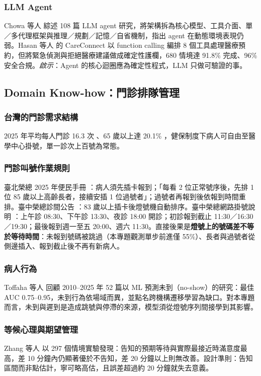 \documentclass[11pt,twocolumn]{article}
\begin{document}
\subsubsection{LLM Agent}
Chowa 等人 \cite{chowa2026} 綜述 108 篇 LLM agent 研究，將架構拆為核心模型、工具介面、單／多代理框架與推理／規劃／記憶／自省機制，指出 agent 在動態環境表現仍弱。Hasan 等人 \cite{hasan2026} 的 CareConnect 以 function calling 編排 8 個工具處理醫療預約，但將緊急偵測與拒絕醫療建議做成確定性護欄，680 情境達 91.8\% 完成、96\% 安全合規。\textit{啟示}：Agent 的核心迴圈應為確定性程式，LLM 只做可驗證的事。

\subsection{Domain Know-how：門診排隊管理}

\subsubsection{台灣的門診需求結構}
2025 年平均每人門診 16.3 次 \cite{nhia2025}、65 歲以上達 20.1\% \cite{moi2025}，健保制度下病人可自由至醫學中心掛號，單一診次上百號為常態。

\subsubsection{門診叫號作業規則}
臺北榮總 2025 年便民手冊 \cite{vghtpe2025}：病人須先插卡報到；「每看 2 位正常號序後，先排 1 位 85 歲以上高齡長者，接續安插 1 位過號者」；過號者再報到後依報到時間重排。臺中榮總診間公告 \cite{vghtcnotice}：83 歲以上插卡後燈號機自動排序。臺中榮總網路掛號說明 \cite{vghtcreg}：上午診 08:30、下午診 13:30、夜診 18:00 開診；初診報到截止 11:30／16:30／19:30；最後報到週一至五 20:00、週六 11:30。直接後果是\textbf{燈號上的號碼差不等於等待時間}：未報到號碼被跳過（本專題觀測單步前進僅 55\%）、長者與過號者從側邊插入、報到截止後不再有新病人。

\subsubsection{病人行為}
Toffaha 等人 \cite{toffaha2025} 回顧 2010--2025 年 52 篇以 ML 預測未到（no-show）的研究：最佳 AUC 0.75--0.95，未到行為依場域而異，並點名跨機構遷移學習為缺口。對本專題而言，未到與遲到是造成跳號與停滯的來源，模型須從燈號序列間接學到其影響。

\subsubsection{等候心理與期望管理}
Zhang 等人 \cite{zhang2023} 以 297 個情境實驗發現：告知的預期等待與實際最接近時滿意度最高，差 10 分鐘內仍顯著優於不告知，差 20 分鐘以上則無改善。設計準則：告知區間而非點估計，寧可略高估，且誤差超過約 20 分鐘就失去意義。
\end{document}
